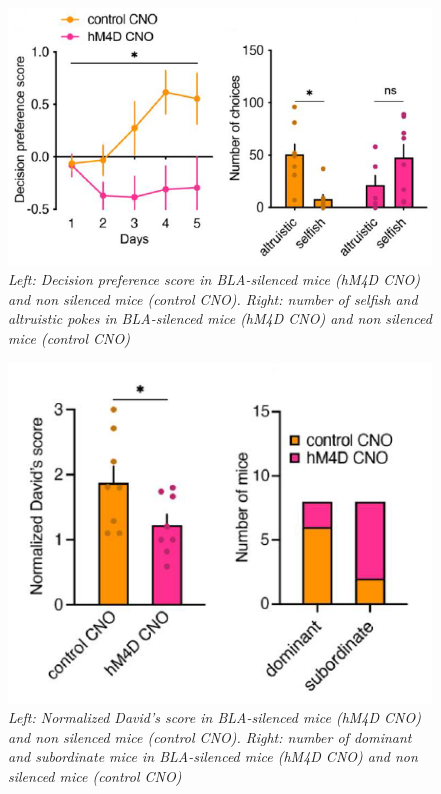 \documentclass[a4paper]{article}
\begin{document}
\begin{figure}[H]
	\begin{center}
		\includegraphics[scale=0.77]{silencing.png} 
	\end{center} 
	\caption{\textit{Left: Decision preference score in BLA-silenced mice (hM4D CNO) and non silenced mice (control CNO). Right: number of selfish and altruistic pokes in BLA-silenced mice (hM4D CNO) and non silenced mice (control CNO) }}
	
\end{figure}


\begin{figure}[H]
	\begin{center}
		\includegraphics[scale=0.77]{sil_dom.png} 
	\end{center} 
	\caption{\textit{Left: Normalized David's score in BLA-silenced mice (hM4D CNO) and non silenced mice (control CNO). Right: number of dominant and subordinate mice in BLA-silenced mice (hM4D CNO) and non silenced mice (control CNO) }}
	
\end{figure}
\end{document}
